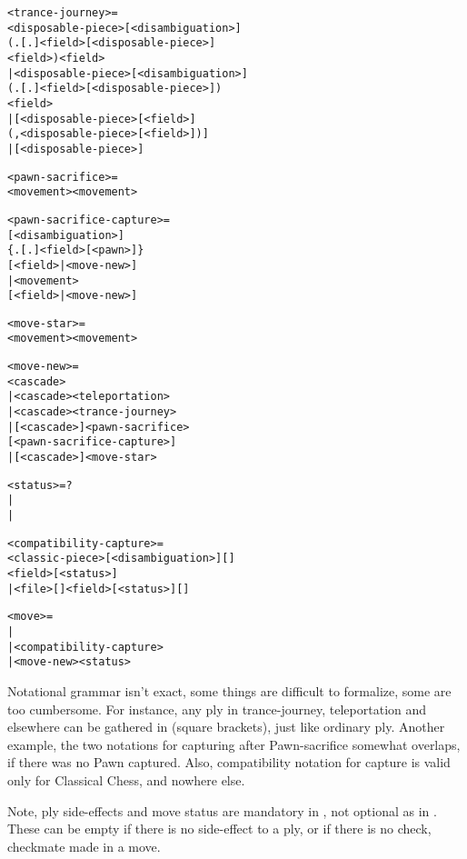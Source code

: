 \begin{alltt}
<trance-journey> =
  <disposable-piece>[<disambiguation>]
    (.[.]<field>\alg{<}[<disposable-piece>]
    <field>)<field>
| <disposable-piece>[<disambiguation>]
    (.[.]<field>\alg{*}[<disposable-piece>])
    <field>
| [<disposable-piece>[<field>]
    (,<disposable-piece>[<field>])]
| [<disposable-piece>]

<pawn-sacrifice> =
  <movement><movement>\alg{::}

<pawn-sacrifice-capture> =
  [<disambiguation>]
    \{.[.]<field>[\alg{*}<pawn>]\}
    [\alg{|}<field>|\alg{~}<move-new>]
| <movement>
    [\alg{|}<field>|\alg{~}<move-new>]

<move-star> =
  <movement>\alg{~}<movement>

<move-new> =
  <cascade>
| <cascade><teleportation>
| <cascade><trance-journey>
| [<cascade>\alg{~}]<pawn-sacrifice>
    [<pawn-sacrifice-capture>]
| [<cascade>\alg{~}]<move-star>
\end{alltt}

\clearpage %

\begin{alltt}
<status> = ?
         | \alg{+}
         | \alg{#}

<compatibility-capture> =
  <classic-piece>[<disambiguation>][]
    <field>[<status>]
| <file>[]<field>[<status>][]

<move> =
  \alg{(=)}
| 
| <compatibility-capture>
| <move-new><status>
\end{alltt}

Notational grammar isn't exact, some things are difficult to formalize, some are
too cumbersome. For instance, any ply in trance-journey, teleportation and
elsewhere can be gathered in \alg{[ ]} (square brackets), just like ordinary ply.
Another example, the two notations for capturing after Pawn-sacrifice somewhat
overlaps, if there was no Pawn captured. Also, compatibility notation for capture
is valid only for Classical Chess, and nowhere else.

Note, ply side-effects and move status are mandatory in , not optional
as in . These can be empty if there is no side-effect to a ply, or if
there is no check, checkmate made in a move.

\clearpage %
